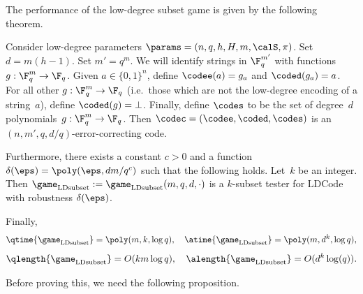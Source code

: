 The performance of the low-degree subset game is given by the following theorem.

\begin{theorem}\label{thm:low-degree-code-tester}
Consider low-degree parameters $\params = (n, q, h, H, m, \calS, \pi)$. Set $d = m(h-1)$.
Set $m' = q^m$.  We will identify strings in $\F_q^{m'}$ with functions $g:\F_q^m \rightarrow \F_q$.
Given $a \in \{0, 1\}^n$, define $\codee(a) = g_a$ and $\coded(g_a) = a$.
For all other $g:\F_q^m \rightarrow \F_q$ (i.e.\ those which are not the low-degree encoding of a string~$a$),
define $\coded(g) = \bot$.
Finally, define $\codes$ to be the set of degree~$d$ polynomials~$g:\F_q^m \rightarrow\F_q$.
Then $\codec = (\codee, \coded, \codes)$ is an $(n, m', q, d/q)$-error-correcting code.

Furthermore, there exists a constant $c > 0$ and a function $\delta(\eps) = \poly(\eps, dm/q^c)$ such that the following holds.
Let~$k$ be an integer.
Then $\game_{\mathrm{LDsubset}} := \game_{\mathrm{LDsubset}}(m, q, d, \cdot)$ is a $k$-subset tester for $\mathrm{LDCode}$ with robustness $\delta(\eps)$.

Finally,
\begin{equation*}
\qtime{\game_{\mathrm{LDsubset}}} = \poly(m, k,\log q),
\quad
\atime{\game_{\mathrm{LDsubset}}} = \poly(m, d^k, \log q),
\end{equation*}
\begin{equation*}
\qlength{\game_{\mathrm{LDsubset}}} = O(k m \log q),
\quad
\alength{\game_{\mathrm{LDsubset}}} = O(d^k \log (q)).
\end{equation*}
\end{theorem}

Before proving this, we need the following proposition.

